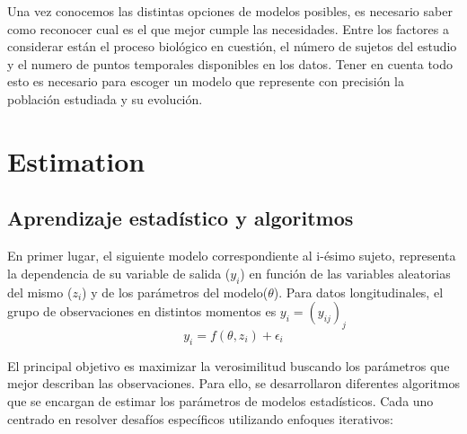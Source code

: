 	Una vez conocemos las distintas opciones de modelos posibles, es necesario saber como reconocer cual es el que mejor cumple las necesidades. Entre los factores a considerar están el proceso biológico en cuestión, el número de sujetos del estudio y el numero de puntos temporales disponibles en los datos. Tener en cuenta todo esto es necesario para escoger un modelo que represente con precisión la población estudiada y su evolución.\\
	
	
	
	
	
	\section{Estimation}
	\subsection{Aprendizaje estadístico y algoritmos}
	En primer lugar, el siguiente modelo correspondiente al i-ésimo sujeto, representa la dependencia de su variable de salida ($y_{i}$) en función de las variables aleatorias del mismo ($z_{i}$) y de los parámetros del modelo($\theta$). Para datos longitudinales, el grupo de observaciones en distintos momentos es $y_{i}=(y_{ij})_{j}$
	\begin{equation}
		y_{i}=f(\theta,z_{i})+\epsilon_{i}
	\end{equation}
	
	El principal objetivo es maximizar la verosimilitud buscando los parámetros que mejor describan las observaciones. Para ello, se desarrollaron diferentes algoritmos que se encargan de estimar los parámetros de modelos estadísticos. Cada uno centrado en resolver desafíos específicos utilizando enfoques iterativos:
	
